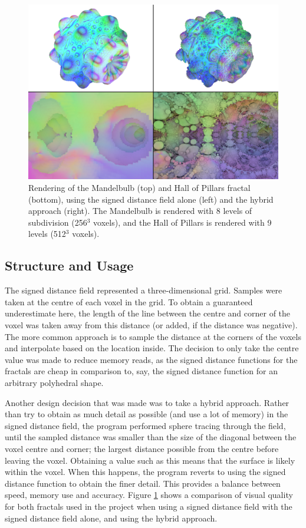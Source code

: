 \begin{figure}[ht]
	\centering
	\includegraphics[width=0.65\linewidth, frame]{Images/SDF-Hybrid-Comparison.png}
	\caption{Rendering of the Mandelbulb (top) and Hall of Pillars fractal (bottom), using the signed distance field alone (left) and the hybrid approach (right). The Mandelbulb is rendered with 8 levels of subdivision (256$^3$ voxels), and the Hall of Pillars is rendered with 9 levels (512$^3$ voxels).}
	\label{figure:sdf-hybrid-comparison}
\end{figure}

\subsection{Structure and Usage}

The signed distance field represented a three-dimensional grid. Samples were taken at the centre of each voxel in the grid. To obtain a guaranteed underestimate here, the length of the line between the centre and corner of the voxel was taken away from this distance (or added, if the distance was negative). The more common approach is to sample the distance at the corners of the voxels and interpolate based on the location inside. The decision to only take the centre value was made to reduce memory reads, as the signed distance functions for the fractals are cheap in comparison to, say, the signed distance function for an arbitrary polyhedral shape.\newline

Another design decision that was made was to take a hybrid approach. Rather than try to obtain as much detail as possible (and use a lot of memory) in the signed distance field, the program performed sphere tracing through the field, until the sampled distance was smaller than the size of the diagonal between the voxel centre and corner; the largest distance possible from the centre before leaving the voxel. Obtaining a value such as this means that the surface is likely within the voxel. When this happens, the program reverts to using the signed distance function to obtain the finer detail. This provides a balance between speed, memory use and accuracy. Figure \ref{figure:sdf-hybrid-comparison} shows a comparison of visual quality for both fractals used in the project when using a signed distance field with the signed distance field alone, and using the hybrid approach.\newline


